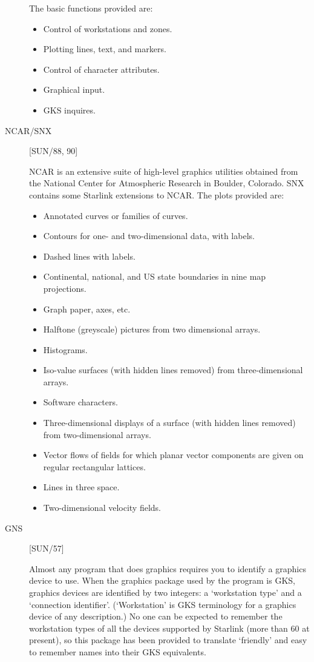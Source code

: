 \begin{description}
The basic functions provided are:
\begin{itemize}
\item Control of workstations and zones.
\item Plotting lines, text, and markers.
\item Control of character attributes.
\item Graphical input.
\item GKS inquires.
\end{itemize}

\item [NCAR/SNX] \hfill [SUN/88, 90]

NCAR is an extensive suite of high-level graphics utilities obtained from the
National Center for Atmospheric Research in Boulder, Colorado.
SNX contains some Starlink extensions to NCAR.
The plots provided are:
\begin{itemize}
\item Annotated curves or families of curves.
\item Contours for one- and two-dimensional data, with labels.
\item Dashed lines with labels.
\item Continental, national, and US state boundaries in nine map projections.
\item Graph paper, axes, etc.
\item Halftone (greyscale) pictures from two dimensional arrays.
\item Histograms.
\item Iso-value surfaces (with hidden lines removed) from three-dimensional
 arrays.
\item Software characters.                      
\item Three-dimensional displays of a surface (with hidden lines removed)
 from two-dimensional arrays.
\item Vector flows of fields for which planar vector components are given on
 regular rectangular lattices.
\item Lines in three space.
\item Two-dimensional velocity fields.
\end{itemize}

\item [GNS] \hfill [SUN/57]

Almost any program that does graphics requires you to identify a graphics
device to use.
When the graphics package used by the program is GKS, graphics devices are
identified by two integers: a `workstation type' and a `connection identifier'.
(`Workstation' is GKS terminology for a graphics device of any description.)
No one can be expected to remember the workstation types of all the devices
supported by Starlink (more than 60 at present), so this package has been
provided to translate `friendly' and easy to remember names into their GKS
equivalents.


\end{description}
